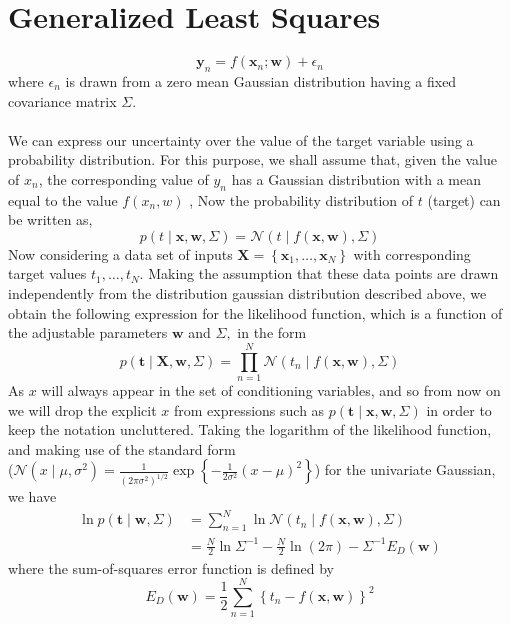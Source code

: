 \documentclass[english,a4paper,12pt]{article}
\begin{document}
\section{Generalized Least Squares}{
$$
\mathbf{y}_{n}=f\left(\mathbf{x}_{n} ; \mathbf{w}\right)+\epsilon_{n}
$$
where $\epsilon_{n}$ is drawn from a zero mean Gaussian distribution having a fixed covariance matrix $\Sigma$. \\ ~\\

We can express our uncertainty over the value of
the target variable using a probability distribution. For this purpose, we shall assume
that, given the value of $x_n$, the corresponding value of $y_n$ has a Gaussian distribution
with a mean equal to the value $f(x_n,w)$ ,  Now the probability distribution of $t$ (target) can be written as, \\
$$
p(t \mid \mathbf{x}, \mathbf{w}, \Sigma)=\mathcal{N}\left(t \mid f(\mathbf{x}, \mathbf{w}), \Sigma\right)
$$
Now considering a data set of inputs $\mathbf{X}=\left\{\mathbf{x}_{1}, \ldots, \mathbf{x}_{N}\right\}$ with corresponding target values $t_{1}, \ldots, t_{N} .$  Making the assumption that these data points are drawn independently from the distribution gaussian distribution described above,  we obtain the following expression for the likelihood function, which is a function of the adjustable parameters $\mathbf{w}$ and $\Sigma,$ in the form
$$
\boxed{
p(\mathbf{t} \mid \mathbf{X}, \mathbf{w}, \Sigma)=\prod_{n=1}^{N} \mathcal{N}\left(t_{n} \mid f(\mathbf{x}, \mathbf{w}), \Sigma\right)}
$$
As $x$ will always appear in the set of conditioning variables, and so from now on we will drop the explicit $x$ from expressions such as $p(\mathbf{t} \mid \mathbf{x}, \mathbf{w}, \Sigma)$ in order to keep the notation uncluttered. Taking the logarithm of the likelihood function, and making use of the standard form \\ ($\mathcal{N}\left(x \mid \mu, \sigma^{2}\right)=\frac{1}{\left(2 \pi \sigma^{2}\right)^{1 / 2}} \exp \left\{-\frac{1}{2 \sigma^{2}}(x-\mu)^{2}\right\}$) for the univariate Gaussian, we have
$$
\begin{aligned}
\ln p(\mathbf{t} \mid \mathbf{w}, \Sigma) &=\sum_{n=1}^{N} \ln \mathcal{N}\left(t_{n} \mid f(\mathbf{x}, \mathbf{w})  , \Sigma\right) \\
&=\frac{N}{2} \ln \Sigma^{-1}-\frac{N}{2} \ln (2 \pi)-\Sigma^{-1} E_{D}(\mathbf{w})
\end{aligned}
$$
where the sum-of-squares error function is defined by
$$
\boxed{
E_{D}(\mathbf{w})=\frac{1}{2} \sum_{n=1}^{N}\left\{t_{n}-f(\mathbf{x}, \mathbf{w})\right\}^{2}}
$$

}
\end{document}

